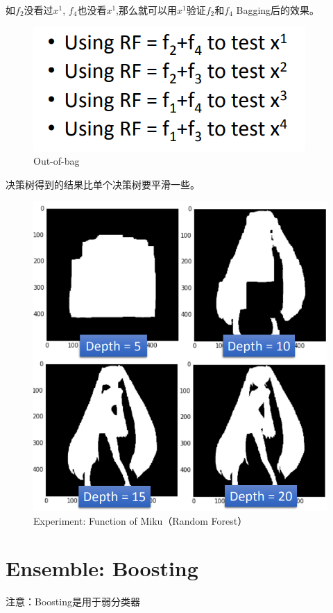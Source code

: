 如$f_2$没看过$x^1$, $f_4$也没看$x^1$,那么就可以用$x^1$验证$f_2$和$f_4$  Bagging后的效果。
\begin{figure}[H]
    \centerline{\includegraphics[scale=0.3]{Part1/Chapter/images/oob2.png}}
    \caption{Out-of-bag}
\end{figure}

决策树得到的结果比单个决策树要平滑一些。
\begin{figure}[H]
    \centerline{\includegraphics[scale=0.3]{Part1/Chapter/images/experiment2.png}}
    \caption{Experiment: Function of Miku（Random Forest）}
\end{figure}

\section{Ensemble: Boosting}
注意：Boosting是用于弱分类器

